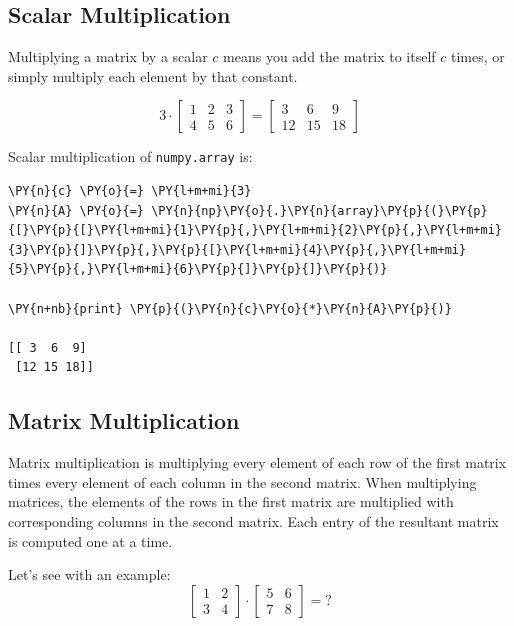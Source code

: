 \subsection{Scalar Multiplication}\label{scalar-multiplication}

Multiplying a matrix by a scalar \(c\) means you add the matrix to
itself \(c\) times, or simply multiply each element by that constant.

\[
3 \cdot
\begin{bmatrix}
1 & 2 & 3 \\
4 & 5 & 6
\end{bmatrix}
=
\begin{bmatrix}
3 & 6 & 9 \\
12 & 15 & 18
\end{bmatrix}
\]

Scalar multiplication of \texttt{numpy.array} is:

\begin{tcolorbox}[breakable, size=fbox, boxrule=1pt, pad at break*=1mm,colback=cellbackground, colframe=cellborder]
\begin{Verbatim}[commandchars=\\\{\}]
\PY{n}{c} \PY{o}{=} \PY{l+m+mi}{3}
\PY{n}{A} \PY{o}{=} \PY{n}{np}\PY{o}{.}\PY{n}{array}\PY{p}{(}\PY{p}{[}\PY{p}{[}\PY{l+m+mi}{1}\PY{p}{,}\PY{l+m+mi}{2}\PY{p}{,}\PY{l+m+mi}{3}\PY{p}{]}\PY{p}{,}\PY{p}{[}\PY{l+m+mi}{4}\PY{p}{,}\PY{l+m+mi}{5}\PY{p}{,}\PY{l+m+mi}{6}\PY{p}{]}\PY{p}{]}\PY{p}{)}

\PY{n+nb}{print} \PY{p}{(}\PY{n}{c}\PY{o}{*}\PY{n}{A}\PY{p}{)}

[[ 3  6  9]
 [12 15 18]]
    \end{Verbatim}
\end{tcolorbox}

\subsection{Matrix Multiplication}\label{matrix-multiplication}

Matrix multiplication is multiplying every element of each row of the
first matrix times every element of each column in the second matrix.
When multiplying matrices, the elements of the rows in the first matrix
are multiplied with corresponding columns in the second matrix. Each
entry of the resultant matrix is computed one at a time.

Let's see with an example: \[ 
\begin{bmatrix}
1 & 2 \\
3 & 4
\end{bmatrix}
\cdot
\begin{bmatrix}
5 & 6 \\
7 & 8
\end{bmatrix}
= ?
\]

